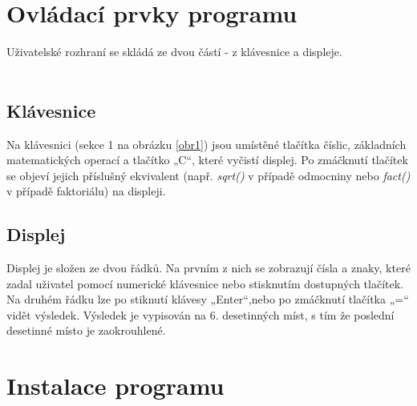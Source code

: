\documentclass[11pt,a4paper,titlepage]{article}
\begin{document}
\section{Ovládací prvky programu}
Uživatelské rozhraní se skládá ze dvou částí - z klávesnice a displeje. \\ \\
\noindent%
\begin{minipage}{\linewidth}
  \label{obr1}
\label{obr1}
\end{minipage}
\subsection{Klávesnice}
Na klávesnici (sekce 1 na obrázku \ref{obr1}) jsou umístěné tlačítka číslic, základních matematických operací a tlačítko „C“, které vyčistí displej. Po zmáčknutí tlačítek se objeví jejich příslušný ekvivalent (např. \emph{sqrt()} v případě odmocniny nebo \emph{fact()} v případě faktoriálu) na displeji.
\subsection{Displej}
Displej je složen ze dvou řádků. Na prvním z nich se zobrazují čísla a znaky, které zadal uživatel pomocí numerické klávesnice nebo stisknutím dostupných tlačítek. Na druhém řádku lze po stiknutí klávesy „Enter“,nebo po zmáčknutí tlačítka „=“ vidět výsledek.
Výsledek je vypisován na 6. desetinných míst, s tím že poslední desetinné místo je zaokrouhlené.
\section{Instalace programu}
\end{document}

